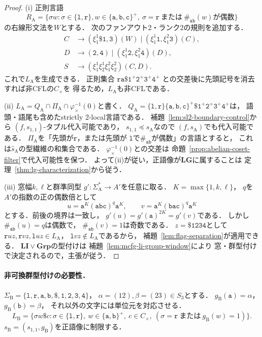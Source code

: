 \begin{proof}
(i) 正則言語
\[
 R_{\mathrm A}=
 \{\sigma w:\sigma\in\{\mathtt l,\mathtt r\},
 w\in\{\mathtt a,\mathtt b,\mathtt c\}^+,
 \ \sigma=\mathtt r\ \text{または}\
 \#_{\mathtt{ab}}(w)\text{が偶数}\}
\]
の右線形文法を$W$とする．
次のファンアウト2・ランク2の規則を追加する．
\[
\begin{aligned}
 C&\to(\xi_1^1\mathtt\$\mathtt1,\mathtt3)(W)
 \mid(\xi_1^1\mathtt1,\xi_1^2\mathtt3)(C),\\
 D&\to(\mathtt2,\mathtt4)
 \mid(\xi_1^1\mathtt2,\xi_1^2\mathtt4)(D),\\
 S&\to(\xi_1^1\xi_2^1\xi_1^2\xi_2^2)(C,D).
\end{aligned}
\]
これで$L_{\mathrm A}$を生成できる．
正則集合
$\mathtt r\mathtt a\mathtt\$\mathtt1^+\mathtt2^+
\mathtt3^+\mathtt4^+$
との交差後に先頭記号を消去すれば非CFLの$C_\times$を
得るため，$L_{\mathrm A}$も非CFLである．

(ii) $L_{\mathrm A}=Q_{\mathrm A}\cap\Pi_{\mathrm A}
\cap\varphi_\times^{-1}(0)$と書く．
$Q_{\mathrm A}=\{\mathtt l,\mathtt r\}
\{\mathtt a,\mathtt b,\mathtt c\}^+
\mathtt\$\mathtt1^+\mathtt2^+\mathtt3^+\mathtt4^+$は，
語頭・語尾も含めたstrictly 2-local言語である．
補題~\ref{lem:sl2-boundary-control}から
$(f,s_{1,1})$-タプル代入可能であり，
$s_{1,1}\preceq s_{\mathrm A}$なので
$(f,s_{\mathrm A})$でも代入可能である．
$\Pi_{\mathrm A}$を「先頭が$\mathtt r$，または先頭が
$\mathtt l$で$\#_{\mathtt{ab}}$が偶数」の言語とすると，
これは$\widehat{s}_{\mathrm A}$の型繊維の和集合である．
$\varphi_\times^{-1}(0)$との交差は
命題~\ref{prop:abelian-coset-filter}で代入可能性を保つ．
よって(ii)が従い，正語像が$\mathbf{LG}$に属することは
定理~\ref{thm:lg-characterization}から従う．

(iii) 窓幅$k,\ell$と群準同型
$g':\Sigma_{\mathrm A}^*\to A'$を任意に取る．
$K=\max\{1,k,\ell\}$，
$q$を$A'$の指数の正の偶数倍として
\[
 u=\mathtt a^K(\mathtt{abc})^q\mathtt a^K,\qquad
 v=\mathtt a^K(\mathtt{bac})^q\mathtt a^K
\]
とする．前後の境界は一致し，
$g'(u)=g'(\mathtt a)^{2K}=g'(v)$である．
しかし$\#_{\mathtt{ab}}(u)=q$は偶数で，
$\#_{\mathtt{ab}}(v)=1$は奇数である．
$z=\mathtt\$\mathtt{1234}$として
$\mathtt r uz,\mathtt r vz,\mathtt l uz\in L_{\mathrm A}$，
$\mathtt l vz\notin L_{\mathrm A}$であるから，
補題~\ref{lem:flag-separation}が適用できる．
$\mathbf{LI}\vee\mathbf{Grp}$の型付けは
補題~\ref{lem:mcfg-li-group-window}により
窓・群型付けで決定されるので，主張が従う．
\end{proof}

\paragraph{非可換群型付けの必要性．}
$\Sigma_{\mathrm B}=\{\mathtt l,\mathtt r,\mathtt a,\mathtt b,
\mathtt\$, \mathtt1,\mathtt2,\mathtt3,\mathtt4\}$，
$\alpha=(12),\beta=(23)\in S_3$とする．
$g_{\mathrm B}(\mathtt a)=\alpha$，
$g_{\mathrm B}(\mathtt b)=\beta$，
それ以外の文字には単位元を対応させる．
\[
 L_{\mathrm B}=
 \{\sigma w\mathtt\$c:
 \sigma\in\{\mathtt l,\mathtt r\},\
 w\in\{\mathtt a,\mathtt b\}^+,\ c\in C_\times,\
 (\sigma=\mathtt r\ \text{または}\ g_{\mathrm B}(w)=1)\}.
\]
$s_{\mathrm B}=(s_{1,1},g_{\mathrm B})$を正語像に制限する．

